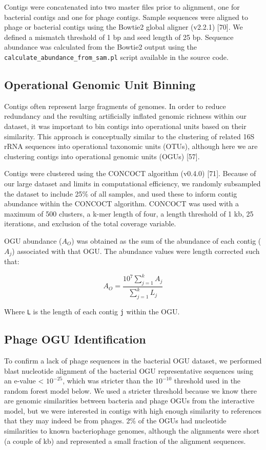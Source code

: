 \documentclass[12pt,]{article}
\begin{document}
Contigs were concatenated into two master files prior to alignment, one
for bacterial contigs and one for phage contigs. Sample sequences were
aligned to phage or bacterial contigs using the Bowtie2 global aligner
(v2.2.1) {[}70{]}. We defined a mismatch threshold of 1 bp and seed
length of 25 bp. Sequence abundance was calculated from the Bowtie2
output using the \texttt{calculate\_abundance\_from\_sam.pl} script
available in the source code.

\subsection{Operational Genomic Unit
Binning}\label{operational-genomic-unit-binning}

Contigs often represent large fragments of genomes. In order to reduce
redundancy and the resulting artificially inflated genomic richness
within our dataset, it was important to bin contigs into operational
units based on their similarity. This approach is conceptually similar
to the clustering of related 16S rRNA sequences into operational
taxonomic units (OTUs), although here we are clustering contigs into
operational genomic units (OGUs) {[}57{]}.

Contigs were clustered using the CONCOCT algorithm (v0.4.0) {[}71{]}.
Because of our large dataset and limits in computational efficiency, we
randomly subsampled the dataset to include 25\% of all samples, and used
these to inform contig abundance within the CONCOCT algorithm. CONCOCT
was used with a maximum of 500 clusters, a k-mer length of four, a
length threshold of 1 kb, 25 iterations, and exclusion of the total
coverage variable.

OGU abundance (\(A_{O}\)) was obtained as the sum of the abundance of
each contig (\(A_{j}\)) associated with that OGU. The abundance values
were length corrected such that:

\[ { A }_{ O }=\frac { { 10 }^{ 7 }\sum _{ j=1 }^{ k }{ { A }_{ j } }  }{ \sum _{ j=1 }^{ k }{ { L }_{ j } }  } \]

Where \texttt{L} is the length of each contig \texttt{j} within the OGU.

\subsection{Phage OGU Identification}\label{phage-ogu-identification}

To confirm a lack of phage sequences in the bacterial OGU dataset, we
performed blast nucleotide alignment of the bacterial OGU representative
sequences using an e-value \textless{} \(10^{-25}\), which was stricter
than the \(10^{-10}\) threshold used in the random forest model below.
We used a stricter threshold because we know there are genomic
similarities between bacteria and phage OGUs from the interactive model,
but we were interested in contigs with high enough similarity to
references that they may indeed be from phages. 2\% of the OGUs had
nucleotide similarities to known bacteriophage genomes, although the
alignments were short (a couple of kb) and represented a small fraction
of the alignment sequences.
\end{document}
